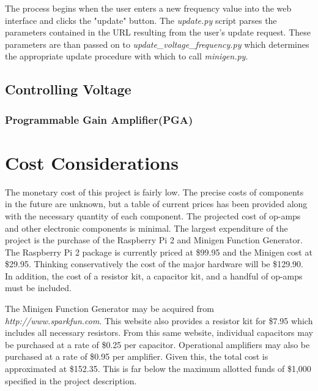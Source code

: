 \documentclass{article}	%
\begin{document}
\begin{multicols}{2}
The process begins when the user 
enters a new frequency value into the web interface
and clicks the "update" button.
The \textit{update.py} script parses 
the parameters contained in the URL
resulting from the user's update request.
These parameters are than
passed on to \textit{update\_voltage\_frequency.py}
which determines the appropriate update procedure 
with which to call \textit{minigen.py}.


\subsection{Controlling Voltage}

\subsubsection{Programmable Gain Amplifier(PGA)}


\section{Cost Considerations}
The monetary cost of this project is fairly low. 
The precise costs of components in the future are unknown, but
a table 
of current prices has been provided
along with the necessary quantity of each component.
The projected cost of op-amps and other electronic components is minimal. 
The largest expenditure of the project is
the purchase of the 
Raspberry Pi 2 and 
Minigen Function Generator. 
The Raspberry Pi 2 package is currently priced at \$99.95 and
the Minigen cost at \$29.95.
Thinking conservatively the cost of the major hardware will be \$129.90. 
In addition, the cost of 
a resistor kit, 
a capacitor kit, and 
a handful of op-amps 
must be included.

The Minigen Function Generator may be acquired from 
\textit{http://www.sparkfun.com}.
This website also provides 
a resistor kit for \$7.95 
which includes all necessary resistors. 
From this same website,
individual capacitors may be purchased
at a rate of \$0.25 per capacitor.
Operational amplifiers may also be purchased at
a rate of \$0.95 per amplifier.
Given this,
the total cost is approximated at \$152.35. 
This is far below the maximum allotted funds of \$1,000
specified in the project description.

\begin{center}
    \begin{tabularx}{0.4\textwidth}{|X|X|X|X|}
        \hline


\end{tabularx}
\end{center}
\end{multicols}
\end{document}
